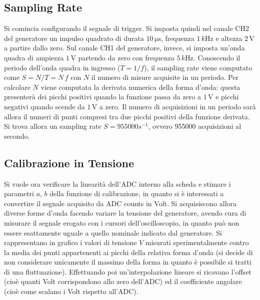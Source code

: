 \documentclass[a4paper,11pt]{article} %
\begin{document}
\subsection{Sampling Rate}
Si comincia configurando il segnale di trigger. Si imposta quindi nel canale CH2 del generatore un impulso quadrato di
durata $10\,\si{\us}$, frequenza $1\,\si{k\hertz}$ e altezza $2\,\si{\volt}$ a partire dallo zero. Sul canale CH1 del
generatore, invece, si imposta un'onda quadra di ampiezza $1\,\si{\volt}$ partendo da zero con frequenza
$5\,\si{k\hertz}$. Conoscendo il periodo dell'onda quadra in ingresso ($T=1/f$), il sampling rate viene computato come
$S = N / T = N \, f$ con $N$ il numero di misure acquisite in un periodo. Per calcolare $N$ viene computata la derivata
numerica della forma d'onda: questa presenterà dei picchi positivi quando la funzione passa da zero a $1\,\si{\volt}$ e
picchi negativi quando scende da $1\,\si{\volt}$ a zero. Il numero di acquisizioni in un periodo sarà allora il numeri
di punti compresi tra due picchi positivi della funzione derivata. Si trova allora un sampling rate $S = 955000 s^{-1}$,
ovvero 955000 acquisizioni al secondo.



\subsection{Calibrazione in Tensione}
Si vuole ora verificare la linearità dell'ADC interno alla scheda e stimare i parametri $a$, $b$ della funzione di
calibrazione, in quanto si è interessati a convertire il segnale acquisito da ADC counts in Volt. Si acquisiscono allora
diverse forme d'onda facendo variare la tensione del generatore, avendo cura di misurare il segnale erogato con i
cursori dell'oscilloscopio, in quanto può non essere esattamente uguale a quello nominale indicato dal generatore. Si
rappresentano in grafico i valori di tensione $V$ misurati sperimentalmente contro la media dei punti appartenenti ai
picchi della relativa forma d'onda (si decide di non considerare unicamente il massimo della forma in quanto è possibile
si tratti di una fluttuazione). Effettuando poi un'interpolazione lineare si ricavano l'offset (cioè
quanti Volt corrispondono allo zero dell'ADC) ed il coefficiente angolare (cioè come scalano i Volt rispetto all'ADC).
\end{document}
